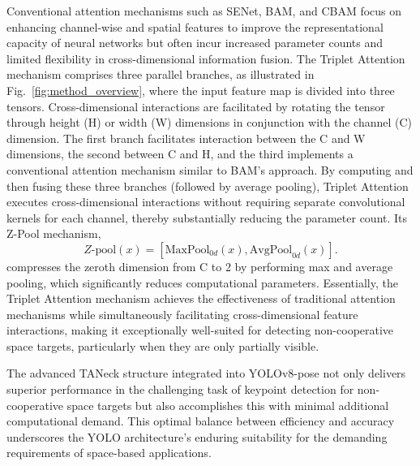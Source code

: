 \documentclass[a4paper,fleqn]{cas-sc}
\begin{document}
Conventional attention mechanisms such as SENet, BAM, and CBAM \citep{senet, cbam, bam} focus on enhancing channel-wise and spatial features to improve the representational capacity of neural networks but often incur increased parameter counts and limited flexibility in cross-dimensional information fusion. The Triplet Attention mechanism comprises three parallel branches, as illustrated in Fig.~\ref{fig:method_overview}, where the input feature map is divided into three tensors. Cross-dimensional interactions are facilitated by rotating the tensor through height (H) or width (W) dimensions in conjunction with the channel (C) dimension. The first branch facilitates interaction between the C and W dimensions, the second between C and H, and the third implements a conventional attention mechanism similar to BAM's approach. By computing and then fusing these three branches (followed by average pooling), Triplet Attention executes cross-dimensional interactions without requiring separate convolutional kernels for each channel, thereby substantially reducing the parameter count. Its Z-Pool mechanism,
\begin{equation}
Z\text{-pool}(x) = [\text{MaxPool}_{0d}(x), \text{AvgPool}_{0d}(x)].
\end{equation}
compresses the zeroth dimension from C to 2 by performing max and average pooling, which significantly reduces computational parameters. Essentially, the Triplet Attention mechanism achieves the effectiveness of traditional attention mechanisms while simultaneously facilitating cross-dimensional feature interactions, making it exceptionally well-suited for detecting non-cooperative space targets, particularly when they are only partially visible.

The advanced TANeck structure integrated into YOLOv8-pose not only delivers superior performance in the challenging task of keypoint detection for non-cooperative space targets but also accomplishes this with minimal additional computational demand. This optimal balance between efficiency and accuracy underscores the YOLO architecture's enduring suitability for the demanding requirements of space-based applications.
\end{document}
